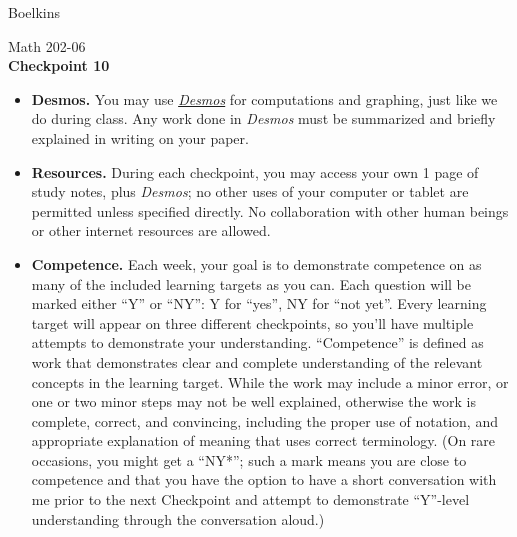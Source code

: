 \documentclass[11 pt]{article}
\begin{document}
 \hfill Boelkins \\
 
\begin{center}
Math 202-06 \\
{\bf Checkpoint 10}
\end{center}



\begin{itemize}
	
	\item {\bf Desmos.} You may use \href{https://www.desmos.com/calculator}{\emph{Desmos}} for computations and graphing, just like we do during class.  Any work done in \emph{Desmos} must be summarized and briefly explained in writing on your paper.  
	
	\item {\bf Resources.} During each checkpoint, you may access your own 1 page of study notes, plus \emph{Desmos}; no other uses of your computer or tablet are permitted unless specified directly.  No collaboration with other human beings or other internet resources are allowed.
	
	
	\item {\bf Competence.} Each week, your goal is to demonstrate competence on as many of the included learning targets as you can.  Each question will be marked either ``Y'' or ``NY'': Y for ``yes'', NY for ``not yet''.  Every learning target will appear on three different checkpoints, so you'll have multiple attempts to demonstrate your understanding.  ``Competence'' is defined as work that demonstrates clear and complete understanding of the relevant concepts in the learning target. While the work may include a minor error, or one or two minor steps may not be well explained, otherwise the work is complete, correct, and convincing, including the proper use of notation, and appropriate explanation of meaning that uses correct terminology.  (On rare occasions, you might get a ``NY*''; such a mark means you are close to competence and that you have the option to have a short conversation with me prior to the next Checkpoint and attempt to demonstrate ``Y''-level understanding through the conversation aloud.)	
\end{itemize}

\noindent \hrulefill \\
\end{document}
